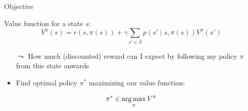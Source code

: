 \begin{frame}[c]{Objective}

Value function for a state $s$:
$$V^\pi (s) = r(s, \pi(s)) + \gamma \sum_{s'\in S} p(s'\mid s, \pi(s)) V^\pi (s')$$

\begin{itemize}
    \item[$\leadsto$] How much (discounted) reward can I expect by following my policy $\pi$ from this state onwards
    \bigskip
    \pause
    \item Find optimal policy $\pi^*$ maximizing our value function:
\end{itemize}

$$ \pi^* \in \operatorname*{arg\,max}_{\pi} V^\pi$$

\end{frame}

